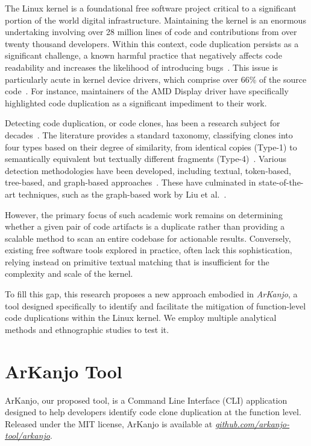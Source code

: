 \documentclass[conference]{IEEEtran}
\begin{document}
The Linux kernel is a foundational free software project 
critical to a significant portion of the world digital infrastructure. Maintaining 
the kernel is an enormous undertaking involving over 28 million lines of code 
and contributions from over twenty thousand developers. Within this context, code 
duplication persists as a significant challenge, a known harmful practice that 
negatively affects code readability and increases the likelihood of introducing
bugs~\cite{harmone,harmtwo}. This issue is particularly acute in kernel device drivers, which comprise over 66\% of the source code~\cite{marcelo}. 
For instance, maintainers of the AMD Display driver have specifically highlighted code duplication as a significant impediment to their work.

Detecting code duplication, or code clones, has been a research subject for 
decades~\cite{firstman}. The literature provides a standard taxonomy, classifying 
clones into four types based on their degree of similarity, from identical copies 
(Type-1) to semantically equivalent but textually different fragments (Type-4)~\cite{litreview}. 
Various detection methodologies have been developed, including textual, token-based, 
tree-based, and graph-based approaches~\cite{litreview}. These have culminated in 
state-of-the-art techniques, such as the graph-based work by Liu et al.~\cite{tailor}.

However, the primary focus of such academic work remains on determining whether a given pair of code artifacts is a duplicate rather than providing a scalable method to scan 
an entire codebase for actionable results. Conversely, existing free software tools explored 
in practice, often lack this sophistication, relying instead on primitive textual matching 
that is insufficient for the complexity and scale of the kernel.

To fill this gap, this research proposes a new approach embodied in \textit{ArKanjo}, a tool 
designed specifically to identify and facilitate the mitigation of function-level code 
duplications within the Linux kernel. We employ multiple analytical 
methods and ethnographic studies to test it.


\section{ArKanjo Tool}

ArKanjo, our proposed tool, is a Command Line Interface (CLI) application designed to
help developers identify code clone duplication at the function level. Released under the
MIT license, ArKanjo is available at 
\textit{\href{https://github.com/arkanjo-tool/arkanjo}{github.com/arkanjo-tool/arkanjo}}.
\end{document}
